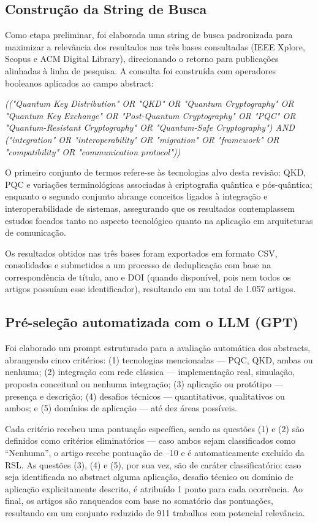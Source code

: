 \documentclass{siintec}
\begin{document}
\subsection{Construção da String de Busca}
Como etapa preliminar, foi elaborada uma string de busca padronizada para maximizar a relevância dos resultados nas três bases consultadas (IEEE Xplore, Scopus e ACM Digital Library), direcionando o retorno para publicações alinhadas à linha de pesquisa. A consulta foi construída com operadores booleanos aplicados ao campo abstract:

\textit{(("Quantum Key Distribution" OR "QKD" OR "Quantum Cryptography" OR "Quantum Key Exchange" OR "Post-Quantum Cryptography" OR "PQC" OR "Quantum-Resistant Cryptography" OR "Quantum-Safe Cryptography")  
AND  
("integration" OR "interoperability" OR "migration" OR "framework" OR "compatibility" OR "communication protocol"))
}

O primeiro conjunto de termos refere-se às tecnologias alvo desta revisão: QKD, PQC e variações terminológicas associadas à criptografia quântica e pós-quântica; enquanto o segundo conjunto abrange conceitos ligados à integração e interoperabilidade de sistemas, assegurando que os resultados contemplassem estudos focados tanto no aspecto tecnológico quanto na aplicação em arquiteturas de comunicação.

Os resultados obtidos nas três bases foram exportados em formato CSV, consolidados e submetidos a um processo de deduplicação com base na correspondência de título, ano e DOI (quando disponível, pois nem todos os artigos possuíam esse identificador), resultando em um total de 1.057 artigos.

\subsection{Pré-seleção automatizada com o LLM (GPT)}
Foi elaborado um prompt estruturado para a avaliação automática dos abstracts, abrangendo cinco critérios: (1) tecnologias mencionadas — PQC, QKD, ambas ou nenhuma; (2) integração com rede clássica — implementação real, simulação, proposta conceitual ou nenhuma integração; (3) aplicação ou protótipo — presença e descrição; (4) desafios técnicos — quantitativos, qualitativos ou ambos; e (5) domínios de aplicação — até dez áreas possíveis.

Cada critério recebeu uma pontuação específica, sendo as questões (1) e (2) são definidos como critérios eliminatórios — caso ambos sejam classificados como “Nenhuma”, o artigo recebe pontuação de –10 e é automaticamente excluído da RSL. As questões (3), (4) e (5), por sua vez, são de caráter classificatório: caso seja identificada no abstract alguma aplicação, desafio técnico ou domínio de aplicação explicitamente descrito, é atribuído 1 ponto para cada ocorrência. Ao final, os artigos são ranqueados com base no somatório das pontuações, resultando em um conjunto reduzido de 911 trabalhos com potencial relevância.
\end{document}
